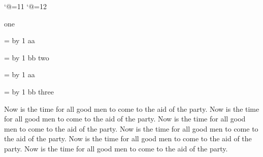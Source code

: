 
%
\catcode`@=11
\newcount\pexsubcnt
\newdimen\aa@add
\def\aa{\par
   \if@firstaalabel
      \ifdim\ep@aaleftskip=0pt
         \ep@aaleftskip=\leftskip
         \advance\ep@aaleftskip by \lingsublabeloffset
         \aa@add=\lingsubtextoffset
         \advance\aa@add by \lingsublabelwidth
         \advance\ep@aaleftskip by \aa@add
         \fi
      \@firstaalabelfalse
      \pexsubcnt=0
      \fi
   \leftskip=\ep@aaleftskip
   \leavevmode
   \advance\pexsubcnt by 1
}
\catcode`@=12

\pex
\a  one
\aa aa
\aa bb
\a  two
\aa aa
\aa bb
\a  three
\xe


\bye

\vsize=3.6in
\hsize=3in

\leavevmode
\vskip2.1in

\ex[exbreakfil=0pt plus 1.6in]
Now is the time for all good men to come to the aid of the party.
Now is the time for all good men to come to the aid of the party.
Now is the time for all good men to come to the aid of the party.
Now is the time for all good men to come to the aid of the party.
Now is the time for all good men to come to the aid of the party.
Now is the time for all good men to come to the aid of the party.
\xe
\endinput

\pex
\a
Now is the time for all good men to come to the aid of the
party.
\a
Now is the time for all good men to come to the aid of the party.
\a
Now is the time for all good men to come to the aid of the party.
\a
Now is the time for all good men to come to the aid of the party.
\a
Now is the time for all good men to come to the aid of the party.
\a
Now is the time for all good men to come to the aid of the party.
\a
Now is the time for all good men to come to the aid of the party.
\xe



